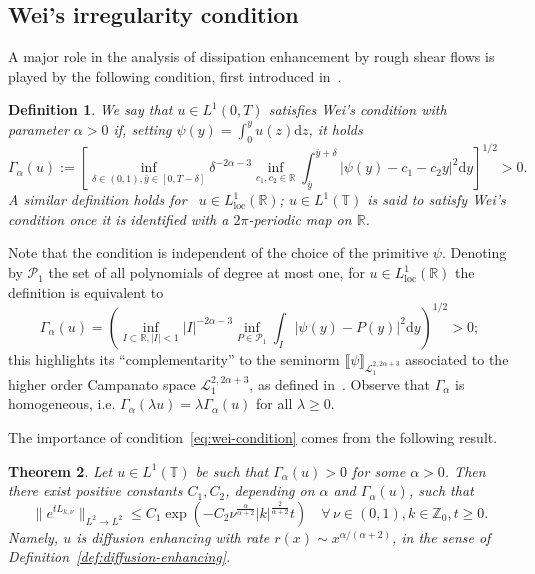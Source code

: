 \documentclass[11pt,oneside,reqno]{amsart}
\newcommand{\assign}{:=}
\newcommand{\mathd}{\mathrm{d}}
\newcommand{\tmop}[1]{\ensuremath{\operatorname{#1}}}
\newtheorem{theorem}{Theorem}[section]
\newtheorem{definition}[theorem]{Definition}
\numberwithin{equation}{section}
\begin{document}
\subsection{Wei's irregularity condition}\label{sec:wei-enhanced}

A major role in the analysis of dissipation enhancement by rough shear flows
is played by the following condition, first introduced in~{\cite{wei}}.

\begin{definition}
  \label{def:wei-condition}We say that $u \in L^1 (0, T)$ satisfies Wei's
  condition with parameter $\alpha > 0$ if, setting $\psi (y) = \int_0^y u (z)
  \mathd z$, it holds
  \begin{equation}
    \Gamma_{\alpha} (u) \assign \left[ \inf_{\delta \in (0, 1), \bar{y} \in
    [0, T - \delta]} \delta^{- 2 \alpha - 3} \inf_{c_1, c_2 \in \mathbb{R}}
    \int_{\bar{y}}^{\bar{y} + \delta} | \psi (y) - c_1 - c_2 y |^2 \mathd y
    \right]^{1 / 2} > 0. \label{eq:wei-condition}
  \end{equation}
  A similar definition holds for \ $u \in L^1_{\tmop{loc}} (\mathbb{R})$; $u
  \in L^1 (\mathbb{T})$ is said to satisfy Wei's condition once it is
  identified with a $2 \pi$-periodic map on $\mathbb{R}$.
\end{definition}

\begin{remark}
  Note that the condition is independent of the choice of the primitive
  $\psi$. Denoting by $\mathcal{P}_1$ the set of all polynomials of degree at
  most one, for $u \in L^1_{\tmop{loc}} (\mathbb{R})$ the definition is
  equivalent to
  \[ \Gamma_{\alpha} (u) = \left( \inf_{I \subset \mathbb{R}, | I | < 1} | I
     |^{- 2 \alpha - 3} \inf_{P \in \mathcal{P}_1} \int_I | \psi (y) - P (y)
     |^2 \mathd y \right)^{1 / 2} > 0 ; \]
  this highlights its ``complementarity'' to the seminorm $\llbracket \psi
  \rrbracket_{\mathcal{L}^{2, 2 \alpha + 3}_1}$ associated to the higher order
  Campanato space $\mathcal{L}_1^{2, 2 \alpha + 3}$, as defined
  in~{\cite{campanato1964}}. Observe that $\Gamma_{\alpha}$ is homogeneous,
  i.e. $\Gamma_{\alpha} (\lambda u) = \lambda \Gamma_{\alpha} (u)$ for all
  $\lambda \geqslant 0$.
\end{remark}

The importance of condition~\eqref{eq:wei-condition} comes from the following
result.

\begin{theorem}
  \label{thm:wei}Let $u \in L^1 (\mathbb{T})$ be such that $\Gamma_{\alpha}
  (u) > 0$ for some $\alpha > 0$. Then there exist positive constants $C_1,
  C_2$, depending on $\alpha$ and $\Gamma_{\alpha} (u)$, such that
  \begin{equation}
    \| e^{t L_{k, \nu}} \|_{L^2 \rightarrow L^2} \leqslant C_1 \exp \left( -
    C_2 \nu^{\frac{\alpha}{\alpha + 2}}  | k |^{\frac{2}{\alpha + 2}} t
    \right) \quad \forall \, \nu \in (0, 1), k \in \mathbb{Z}_0, t \geqslant
    0. \label{eq:wei-conclusion}
  \end{equation}
  Namely, $u$ is diffusion enhancing with rate $r (x) \sim x^{\alpha / (\alpha
  + 2)}$, in the sense of Definition~\ref{def:diffusion-enhancing}.
\end{theorem}
\end{document}
